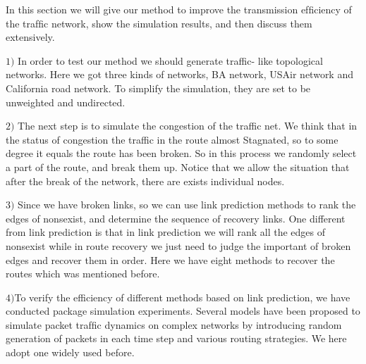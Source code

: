 \documentclass[onecolumn,preprintnumbers,amsmath,amssymb]{revtex4}
\begin{document}
In this section we will give our method to improve the transmission efﬁciency of the  trafﬁc network, show the simulation results, and then discuss them extensively.


$1)$ In order to test our method we should generate traffic- like topological networks. Here we got three kinds of networks, BA network, USAir network and California road network. To simplify the simulation, they are set to be unweighted and undirected.

$2)$ The next step is to simulate the congestion of the traffic net. We think that in the status of congestion the traffic in the route almost Stagnated, so to some degree it equals the route has been broken. So in this process we randomly select a part of the route, and break them up. Notice that we allow the situation that after the break of the network, there are exists individual nodes.

$3)$ Since we have broken links, so we can use link prediction methods to rank the edges of nonsexist, and determine the sequence of recovery links. One different from link prediction is that in link prediction we will rank all the edges of nonsexist while in route recovery we just need to judge the important of broken edges and recover them in order. Here we have eight methods to recover the routes which was mentioned before. 

$4)$To verify the efficiency of different methods based on link prediction, we have conducted package simulation experiments. Several models have been proposed to simulate packet trafﬁc dynamics on complex networks by introducing random generation of packets in each time step and various routing strategies. We here adopt one widely used before.
\end{document}
